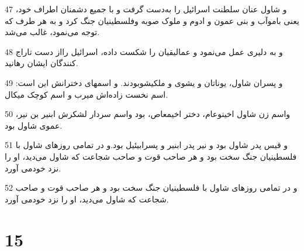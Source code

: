 \par 47 و شاول عنان سلطنت اسرائیل را به‌دست گرفت و با جمیع دشمنان اطراف خود، یعنی باموآب و بنی عمون و ادوم و ملوک صوبه وفلسطینیان جنگ کرد و به هر طرف که توجه می‌نمود، غالب می‌شد.
\par 48 و به دلیری عمل می‌نمود و عمالیقیان را شکست داده، اسرائیل رااز دست تاراج کنندگان ایشان رهانید.
\par 49 و پسران شاول، یوناتان و یشوی و ملکیشوبودند. و اسمهای دخترانش این است: اسم نخست زاده‌اش میرب و اسم کوچک میکال.
\par 50 واسم زن شاول اخینوعام، دختر اخیمعاص، بود واسم سردار لشکرش ابنیر بن نیر، عموی شاول بود.
\par 51 و قیس پدر شاول بود و نیر پدر ابنیر و پسرابیئیل بود.و در تمامی روزهای شاول با فلسطینیان جنگ سخت بود و هر صاحب قوت و صاحب شجاعت که شاول می‌دید، او را نزد خودمی آورد.
\par 52 و در تمامی روزهای شاول با فلسطینیان جنگ سخت بود و هر صاحب قوت و صاحب شجاعت که شاول می‌دید، او را نزد خودمی آورد.
 
\chapter{15}

